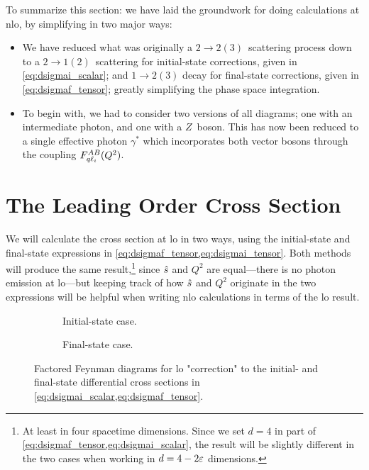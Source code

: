 To summarize this section: we have laid the groundwork for doing calculations at \gls{nlo}, by simplifying in two major ways:
\begin{itemize}
    \item We have reduced what was originally a $2\to2(3)$~scattering process down to a $2\to1(2)$~scattering for initial-state corrections, given in \cref{eq:dsigmai_scalar}; and $1\to2(3)$ decay for final-state corrections, given in \cref{eq:dsigmaf_tensor}; greatly simplifying the phase space integration.
    \item To begin with, we had to consider two versions of all diagrams; one with an intermediate photon, and one with a $Z$~boson. This has now been reduced to a single effective photon $\gamma^*$ which incorporates both vector bosons through the coupling $F_{q\ell_i}^{AB}(Q^2)$.
\end{itemize}


\section{The Leading Order Cross Section}\label{sec:lo}
We will calculate the cross section at \gls{lo} in two ways, using the initial-state and final-state expressions in \cref{eq:dsigmaf_tensor,eq:dsigmai_tensor}.
Both methods will produce the same result,\footnote{At least in four spacetime dimensions. Since we set $d=4$ in part of \cref{eq:dsigmaf_tensor,eq:dsigmai_scalar}, the result will be slightly different in the two cases when working in $d=4-2\varepsilon$ dimensions.}
since $\hat{s}$ and $Q^2$ are equal---there is no photon emission at \gls{lo}---but keeping track of how $\hat{s}$ and $Q^2$ originate in the two expressions will be helpful when writing \gls{nlo} calculations in terms of the \gls{lo} result.

\begin{figure}
    \centering
    \begin{subfigure}[t]{0.45\textwidth}
        \centering
        \caption{Initial-state case.}
        \label{fig:M_lo_left}
    \end{subfigure}
    \begin{subfigure}[t]{0.45\textwidth}
        \centering
        \caption{Final-state case.}
        \label{fig:M_lo_right}
    \end{subfigure}
    \caption{Factored Feynman diagrams for \acrshort{lo} "correction" to the initial- and final-state differential cross sections in \cref{eq:dsigmai_scalar,eq:dsigmaf_tensor}.}
    \label{fig:M_lo_factored}
\end{figure}

